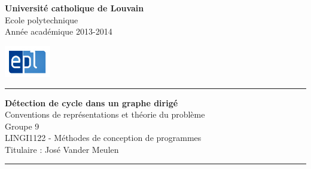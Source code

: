 \begin{minipage}{0.78\linewidth}
\vspace{0.5cm}
\footnotesize\textbf{Université catholique de Louvain}\\
Ecole polytechnique\\
Année académique 2013-2014\\
\end{minipage}
\begin{minipage}{0.1\linewidth}
\begin{flushright}
\includegraphics[width=2cm]{images/logo_EPL.png}
\end{flushright}
\end{minipage}

\vspace{1.5cm}
\par
\hrule height 1.5pt
\par
\vspace{0.5cm}

{\centering
\Large \textbf{Détection de cycle dans un graphe dirigé}\\
\normalsize  Conventions de représentations et théorie du problème\\
\vspace{0.3cm}
\footnotesize Groupe 9\\
LINGI1122 - Méthodes de conception de programmes\\
Titulaire : José Vander Meulen\\}

\vspace{0.5cm}
\par
\hrule height 1.5pt
\par
\vspace{0.5cm}



